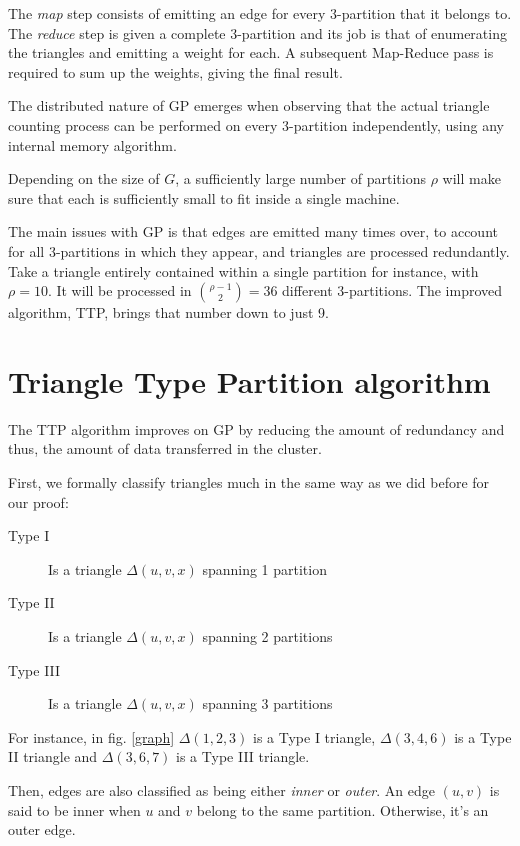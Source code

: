 \documentclass[paper=a4, fontsize=11pt]{scrartcl}
\begin{document}
The \emph{map} step consists of emitting an edge for every 3-partition that it
belongs to. The \emph{reduce} step is given a complete 3-partition and its job
is that of enumerating the triangles and emitting a weight for each. A
subsequent Map-Reduce pass is required to sum up the weights, giving the final
result.

The distributed nature of GP emerges when observing that the actual triangle
counting process can be performed on every 3-partition independently, using any
internal memory algorithm.

Depending on the size of $G$, a sufficiently large number of partitions $\rho$
will make sure that each is sufficiently small to fit inside a single machine.

The main issues with GP is that edges are emitted many times over, to account
for all 3-partitions in which they appear, and triangles are processed
redundantly. Take a triangle entirely contained within a single partition for
instance, with $\rho=10$. It will be processed in $\binom{\rho-1}{2}=36$
different 3-partitions. The improved algorithm, TTP, brings that number down to
just 9.

\section{Triangle Type Partition algorithm}

The TTP algorithm \cite{park2013efficient} improves on GP by reducing the amount
of redundancy and thus, the amount of data transferred in the cluster.

First, we formally classify triangles much in the same way as we did before for
our proof:
\begin{description}
    \item[Type I] Is a triangle $\Delta(u, v, x)$ spanning 1 partition
    \item[Type II] Is a triangle $\Delta(u, v, x)$ spanning 2 partitions
    \item[Type III] Is a triangle $\Delta(u, v, x)$ spanning 3 partitions
\end{description}

For instance, in fig. \ref{graph} $\Delta(1,2,3)$ is a Type I triangle,
$\Delta(3,4,6)$ is a Type II triangle and $\Delta(3,6,7)$ is a Type III
triangle.

Then, edges are also classified as being either \emph{inner} or \emph{outer}. An
edge $(u,v)$ is said to be inner when $u$ and $v$ belong to the same partition.
Otherwise, it's an outer edge.
\end{document}
